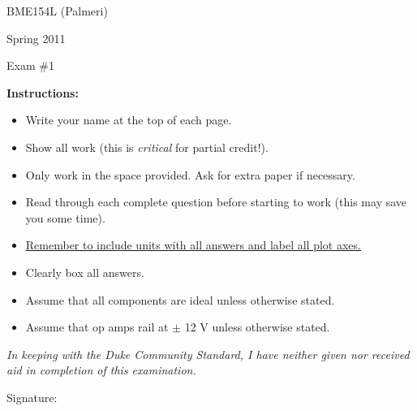 

\vspace*{0.5in}

\centerline{\LARGE BME154L (Palmeri)}
\vspace*{0.25in}
\centerline{\LARGE Spring 2011}
\vspace*{0.25in}
\centerline{\LARGE Exam \#1}
\vspace*{0.25in}

{\bf Instructions:} 
\begin{itemize}
\item Write your name at the top of each page.
\item Show all work (this is {\it critical} for partial credit!).
\item Only work in the space provided.  Ask for extra paper if necessary.
\item Read through each complete question before starting to work (this may
save you some time).
\item \underline{Remember to include units with all answers and label all plot axes.}
\item Clearly box all answers.
\item Assume that all components are ideal unless otherwise stated.
\item Assume that op amps rail at $\pm$ 12 V unless otherwise stated.
\end{itemize}

\vspace*{2.0in}

\emph{In keeping with the Duke Community Standard, I have neither given nor received aid in completion of this examination.}

\vspace*{0.5in}

Signature:\underline{\hspace*{3.0in}}
